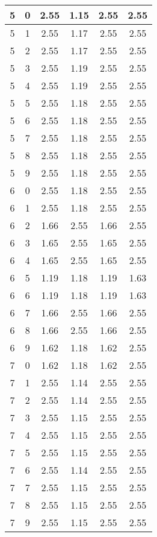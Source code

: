 \begin{longtable}{|c|c||c||c||c|c|}
	5 & 0 & 2.55 & 1.15 & 2.55 & 2.55 \\ \hline
	5 & 1 & 2.55 & 1.17 & 2.55 & 2.55 \\ \hline
	5 & 2 & 2.55 & 1.17 & 2.55 & 2.55 \\ \hline
	5 & 3 & 2.55 & 1.19 & 2.55 & 2.55 \\ \hline
	5 & 4 & 2.55 & 1.19 & 2.55 & 2.55 \\ \hline
	5 & 5 & 2.55 & 1.18 & 2.55 & 2.55 \\ \hline
	5 & 6 & 2.55 & 1.18 & 2.55 & 2.55 \\ \hline
	5 & 7 & 2.55 & 1.18 & 2.55 & 2.55 \\ \hline
	5 & 8 & 2.55 & 1.18 & 2.55 & 2.55 \\ \hline
	5 & 9 & 2.55 & 1.18 & 2.55 & 2.55 \\ \hline
	6 & 0 & 2.55 & 1.18 & 2.55 & 2.55 \\ \hline
	6 & 1 & 2.55 & 1.18 & 2.55 & 2.55 \\ \hline
	6 & 2 & 1.66 & 2.55 & 1.66 & 2.55 \\ \hline
	6 & 3 & 1.65 & 2.55 & 1.65 & 2.55 \\ \hline
	6 & 4 & 1.65 & 2.55 & 1.65 & 2.55 \\ \hline
	6 & 5 & 1.19 & 1.18 & 1.19 & 1.63 \\ \hline
	6 & 6 & 1.19 & 1.18 & 1.19 & 1.63 \\ \hline
	6 & 7 & 1.66 & 2.55 & 1.66 & 2.55 \\ \hline
	6 & 8 & 1.66 & 2.55 & 1.66 & 2.55 \\ \hline
	6 & 9 & 1.62 & 1.18 & 1.62 & 2.55 \\ \hline
	7 & 0 & 1.62 & 1.18 & 1.62 & 2.55 \\ \hline
	7 & 1 & 2.55 & 1.14 & 2.55 & 2.55 \\ \hline
	7 & 2 & 2.55 & 1.14 & 2.55 & 2.55 \\ \hline
	7 & 3 & 2.55 & 1.15 & 2.55 & 2.55 \\ \hline
	7 & 4 & 2.55 & 1.15 & 2.55 & 2.55 \\ \hline
	7 & 5 & 2.55 & 1.15 & 2.55 & 2.55 \\ \hline
	7 & 6 & 2.55 & 1.14 & 2.55 & 2.55 \\ \hline
	7 & 7 & 2.55 & 1.15 & 2.55 & 2.55 \\ \hline
	7 & 8 & 2.55 & 1.15 & 2.55 & 2.55 \\ \hline
	7 & 9 & 2.55 & 1.15 & 2.55 & 2.55 \\ \hline
\end{longtable}

